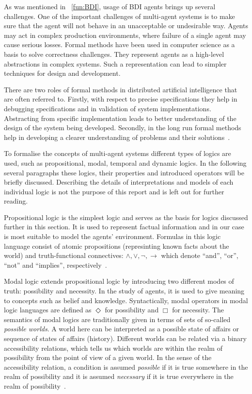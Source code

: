 As was mentioned in ~\autoref{fun:BDI}, usage of BDI agents brings up several challenges.
One of the important challenges of multi-agent systems is to make sure that the agent will not behave in an unacceptable or undesirable way.
Agents may act in complex production environments, where failure of a single agent may cause serious losses.
Formal methods have been used in computer science as a basis to solve correctness challenges.
They represent agents as a high-level abstractions in complex systems.
Such a representation can lead to simpler techniques for design and development.

There are two roles of formal methods in distributed artificial intelligence that are often referred to.
Firstly, with respect to precise specifications they help in debugging specifications and in validation of system implementations.
Abstracting from specific implementation leads to better understanding of the design of the system being developed.
Secondly, in the long run formal methods help in developing a clearer understanding of problems and their solutions~\cite{Singh_99}.

To formalise the concepts of multi-agent systems different types of logics are used, such as propositional, modal, temporal and dynamic logics.
In the following several paragraphs these logics, their properties and introduced operators will be briefly discussed.
Describing the details of interpretations and models of each individual logic is not the purpose of this report and is left out for further reading.

Propositional logic is the simplest logic and serves as the basis for logics discussed further in this section.
It is used to represent factual information and in our case is most suitable to model the agents' environment.
Formulas in this logic language consist of atomic propositions (represinting known facts about the world) and truth-functional connectives: $\land,\lor,\neg,\rightarrow$ which denote \enquote{and}, \enquote{or}, \enquote{not} and \enquote{implies}, respectively~\cite{Enderton_72}.

Modal logic extends propositional logic by introducing two different modes of truth: possibility and necessity.
In the study of agents, it is used to give meaning to concepts such as belief and knowledge.
Syntactically, modal operators in modal logic languages are defined as $\Diamond$  for possibility and $\Box$ for necessity.
The semantics of modal logics are traditionally given in terms of sets of so-called \emph{possible worlds}.
A world here can be interpreted as a possible state of affairs or sequence of states of affairs (history).
Different worlds can be related via a binary accessibility relations, which tells us which worlds are within the realm of possibility from the point of view of a given world.
In the sense of the accessibility relation, a condition is assumed \emph{possible} if it is true somewhere in the realm of possibility and it is assumed \emph{necessary} if it is true everywhere in the realm of possibility~\cite{Saul_63}.

